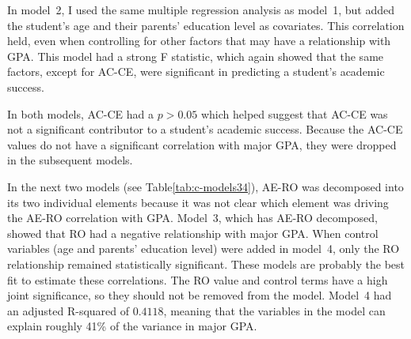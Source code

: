 In model~2, I used the same multiple regression analysis as model~1, but added the student's age and their parents' education level as covariates. This correlation held, even when controlling for other factors that may have a relationship with GPA. This model had a strong F statistic, which again showed that the same factors, except for AC-CE, were significant in predicting a student's academic success.

In both models, AC-CE had a $p>0.05$ which helped suggest that AC-CE was not a significant contributor to a student's academic success. Because the AC-CE values do not have a significant correlation with major GPA, they were dropped in the subsequent models.

In the next two models (see Table\ref{tab:c-models34}), AE-RO was decomposed into its two individual elements because it was not clear which element was driving the AE-RO correlation with GPA. Model~3, which has AE-RO decomposed, showed that RO had a negative relationship with major GPA. When control variables (age and parents' education level) were added in model~4, only the RO relationship remained statistically significant. These models are probably the best fit to estimate these correlations. The RO value and control terms have a high joint significance, so they should not be removed from the model. Model~4 had an adjusted R-squared of $0.4118$, meaning that the variables in the model can explain roughly 41\% of the variance in major GPA.

